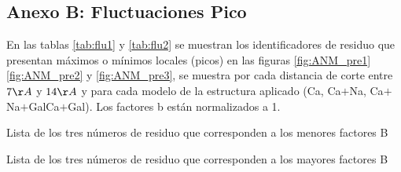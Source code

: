 \begin{appendix}
\chapter{Anexo B: Fluctuaciones Pico}\label{AnexoB}
En las tablas \ref{tab:flu1} y \ref{tab:flu2} se muestran los identificadores de residuo que presentan m\'{a}ximos o m\'{i}nimos locales (picos) en las figuras \ref{fig:ANM_pre1} \ref{fig:ANM_pre2} y \ref{fig:ANM_pre3}, se muestra por cada distancia de corte entre $7\AA$ y $14\AA$ y para cada modelo de la estructura aplicado (Ca, Ca$+$Na, Ca$+$Na$+$GalCa$+$Gal). Los factores b est\'{a}n normalizados a 1. \\
\begin{table}[ht]
\centering
\begin{adjustbox}{width=1.0\textwidth,center}
 
 \end{adjustbox}
 \caption{Lista de los tres n\'{u}meros de residuo que corresponden a los menores factores B}\label{tab:flu1}
\end{table}
\begin{table}[H]
\centering
\begin{adjustbox}{width=1.0\textwidth,center}
 
 \end{adjustbox}
  \caption{Lista de los tres n\'{u}meros de residuo que corresponden a los mayores factores B}\label{tab:flu2}
\end{table}

\end{appendix}
